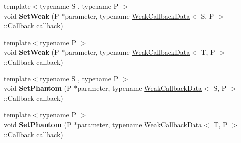 \begin{DoxyCompactItemize}
\item 
\hypertarget{classv8_1_1PersistentBase_a26cacb456e6a02bb8214dfd8a31247c9}{}{\footnotesize template$<$typename S , typename P $>$ }\\void {\bfseries Set\+Weak} (P $\ast$parameter, typename \hyperlink{classv8_1_1WeakCallbackData}{Weak\+Callback\+Data}$<$ S, P $>$\+::Callback callback)\label{classv8_1_1PersistentBase_a26cacb456e6a02bb8214dfd8a31247c9}

\item 
\hypertarget{classv8_1_1PersistentBase_aaf342ece1a4ba926ba62e8d6af7be777}{}{\footnotesize template$<$typename P $>$ }\\void {\bfseries Set\+Weak} (P $\ast$parameter, typename \hyperlink{classv8_1_1WeakCallbackData}{Weak\+Callback\+Data}$<$ T, P $>$\+::Callback callback)\label{classv8_1_1PersistentBase_aaf342ece1a4ba926ba62e8d6af7be777}

\item 
\hypertarget{classv8_1_1PersistentBase_a845d9e98a5ebe03e8966fba4b81614f0}{}{\footnotesize template$<$typename S , typename P $>$ }\\void {\bfseries Set\+Phantom} (P $\ast$parameter, typename \hyperlink{classv8_1_1WeakCallbackData}{Weak\+Callback\+Data}$<$ S, P $>$\+::Callback callback)\label{classv8_1_1PersistentBase_a845d9e98a5ebe03e8966fba4b81614f0}

\item 
\hypertarget{classv8_1_1PersistentBase_a1586acea8a2b8594dd728555223d882e}{}{\footnotesize template$<$typename P $>$ }\\void {\bfseries Set\+Phantom} (P $\ast$parameter, typename \hyperlink{classv8_1_1WeakCallbackData}{Weak\+Callback\+Data}$<$ T, P $>$\+::Callback callback)\label{classv8_1_1PersistentBase_a1586acea8a2b8594dd728555223d882e}

\end{DoxyCompactItemize}
